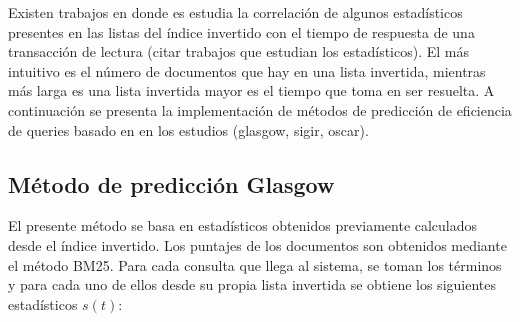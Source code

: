 Existen trabajos en donde es estudia la correlación de algunos estadísticos presentes en las listas del índice invertido con el tiempo de respuesta de una transacción de lectura (citar trabajos que estudian los estadísticos). El más intuitivo es el número de documentos que hay en una lista invertida, mientras más larga es una lista invertida mayor es el tiempo que toma en ser resuelta. A continuación se presenta la implementación de métodos de predicción de eficiencia de queries basado en en los estudios (glasgow, sigir, oscar).  

\subsection{Método de predicción Glasgow}
\label{scheduling:glasgow}
El presente método \citep{Macdonald:2012} se basa en estadísticos obtenidos previamente calculados desde el índice invertido. Los puntajes de los documentos son obtenidos mediante el método BM25. Para cada consulta que llega al sistema, se toman los términos y para cada uno de ellos desde su propia lista invertida se obtiene los siguientes estadísticos $s(t)$:


